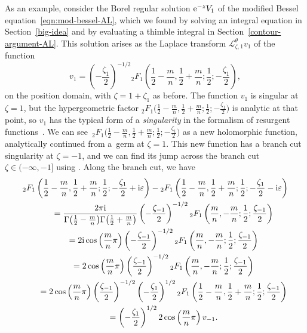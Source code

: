 \documentclass[pdftex]{sigma}
\newcommand{\laplace}{\mathcal{L}}
\numberwithin{equation}{section}
\begin{document}
As an example, consider the Borel regular solution ${\rm e}^{-z} V_1$ of the modified Bessel equation~\eqref{eqn:mod-bessel-AL}, which we found by solving an integral equation in Section~\ref{big-idea} and by evaluating a thimble integral in Section~\ref{contour-argument-AL}. This solution arises as the Laplace transform $\laplace^\theta_{\zeta, 1} v_1$ of the function
\[ v_1 = \left(-\frac{\zeta_1}{2}\right)^{-1/2} {}_2F_1\left(\frac{1}{2}-\frac{m}{n},\frac{1}{2}+\frac{m}{n};\frac{1}{2};-\frac{\zeta_1}{2}\right), \]
on the position domain, with $\zeta=1+\zeta_1$ as before. The function $v_1$ is singular at $\zeta = 1$, but the hypergeometric factor ${}_2F_1\bigl(\frac{1}{2}-\frac{m}{n},\frac{1}{2}+\frac{m}{n};\frac{1}{2};-\frac{\zeta_1}{2}\bigr)$ is analytic at that point, so $v_1$ has the typical form of a {\em singularity} in the formalism of resurgent functions~\cite[Section~2]{sauzin2021variations}. We can see~${{}_2F_1\bigl(\frac{1}{2}-\frac{m}{n},\frac{1}{2}+\frac{m}{n};\frac{1}{2};-\frac{\zeta_1}{2}\bigr)}$ as a new holomorphic function, analytically continued from a~germ at $\zeta = 1$. This new function has a branch cut singularity at $\zeta=-1$, and we can find its jump across the branch cut $\zeta \in (-\infty, -1]$ using \cite[equation~(15.2.3)]{dlmf}. Along the branch cut, we have
\begin{gather*}
{}_2F_1\left(\frac{1}{2}-\frac{m}{n},\frac{1}{2}+\frac{m}{n};\frac{1}{2};-\frac{\zeta_1}{2}+{\rm i}\varepsilon\right)-{}_2F_1\left(\frac{1}{2}-\frac{m}{n},\frac{1}{2}+\frac{m}{n};\frac{1}{2};-\frac{\zeta_1}{2}-{\rm i}\varepsilon\right) \\
\qquad=\frac{2 \pi {\rm i}}{\Gamma\bigl(\frac{1}{2}-\frac{m}{n}\bigr)\Gamma\bigl(\frac{1}{2}+\frac{m}{n}\bigr)} \left(-\frac{\zeta_{-1}}{2}\right)^{-1/2} {}_2F_1\left(\frac{m}{n},-\frac{m}{n};\frac{1}{2};\frac{\zeta_{-1}}{2}\right) \\
\qquad=2{\rm i}\cos\left(\frac{m}{n}\pi\right) \left(-\frac{\zeta_{-1}}{2}\right)^{-1/2} {}_2F_1\left(\frac{m}{n},-\frac{m}{n};\frac{1}{2};\frac{\zeta_{-1}}{2}\right) \\
\qquad=2\cos\left(\frac{m}{n}\pi\right) \left(\frac{\zeta_{-1}}{2}\right)^{-1/2} {}_2F_1\left(\frac{m}{n},-\frac{m}{n};\frac{1}{2};\frac{\zeta_{-1}}{2}\right) \\
\qquad=2\cos\left(\frac{m}{n}\pi\right) \left(\frac{\zeta_{-1}}{2}\right)^{-1/2} \left(-\frac{\zeta_{1}}{2}\right)^{1/2} {}_2F_1\left(\frac{1}{2}-\frac{m}{n},\frac{1}{2}+\frac{m}{n};\frac{1}{2};\frac{\zeta_{-1}}{2}\right) \\
\qquad=\left(-\frac{\zeta_{1}}{2}\right)^{1/2} 2\cos\left(\frac{m}{n}\pi\right) v_{-1}.
\end{gather*}
\end{document}
